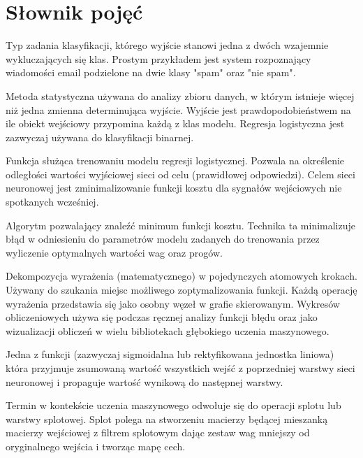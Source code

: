 \documentclass[12pt,a4paper,twoside,titlepage,openright]{book}
\begin{document}
\chapter*{Słownik pojęć}
\begin{description}[style=nextline]
	\item[Klasyfikacja binarna] Typ zadania klasyfikacji, którego wyjście stanowi jedna z dwóch wzajemnie wykluczających się klas. Prostym przykładem jest system rozpoznający wiadomości email podzielone na dwie klasy "spam" oraz "nie spam".
	\item[Regresja logistyczna] Metoda statystyczna używana do analizy zbioru danych, w którym istnieje więcej niż jedna zmienna determinująca wyjście. Wyjście jest prawdopodobieństwem na ile obiekt wejściowy przypomina każdą z klas modelu. Regresja logistyczna jest zazwyczaj używana do klasyfikacji binarnej.
	\item[Funkcja kosztu] Funkcja służąca trenowaniu modelu regresji logistycznej. Pozwala na określenie odległości wartości wyjściowej sieci od celu (prawidłowej odpowiedzi). Celem sieci neuronowej jest zminimalizowanie funkcji kosztu dla sygnałów wejściowych nie spotkanych wcześniej.
	\item[Metoda gradientu prostego (ang. gradient descent algorithm)] Algorytm pozwalający znaleźć minimum funkcji kosztu. Technika ta minimalizuje błąd w odniesieniu do parametrów modelu zadanych do trenowania przez wyliczenie optymalnych wartości wag oraz progów.
	\item[Wykres obliczeniowy (ang. computation graph)] Dekompozycja wyrażenia (matematycznego) w pojedynczych atomowych krokach. Używany do szukania miejsc możliwego zoptymalizowania funkcji. Każdą operację wyrażenia przedstawia się jako osobny węzeł w grafie skierowanym. Wykresów obliczeniowych używa się podczas ręcznej analizy funkcji błędu oraz jako wizualizacji obliczeń w wielu bibliotekach głębokiego uczenia maszynowego.
	\item[Funkcja aktywacji] Jedna z funkcji (zazwyczaj sigmoidalna lub rektyfikowana jednostka liniowa) która przyjmuje zsumowaną wartość wszystkich wejść z poprzedniej warstwy sieci neuronowej i propaguje wartość wynikową do następnej warstwy.
	\item[Konwolucja (ang. convolution)] Termin w kontekście uczenia maszynowego odwołuje się do operacji splotu lub warstwy splotowej. Splot polega na stworzeniu macierzy będącej mieszanką macierzy wejściowej z filtrem splotowym dając zestaw wag mniejszy od oryginalnego wejścia i tworząc mapę cech.

\end{description}
\end{document}
